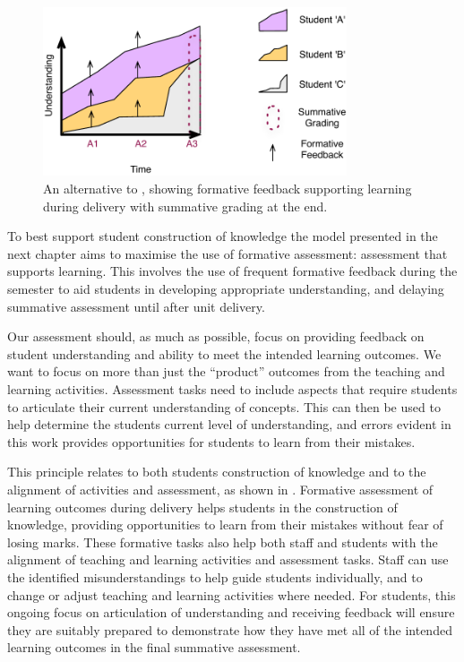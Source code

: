 \begin{figure}[h]
	\centering
	\includegraphics[width=0.8\textwidth]{FormativeFeedback}
	\caption{An alternative to , showing formative feedback supporting learning during delivery with summative grading at the end.}
	\label{fig:formative}
\end{figure}

To best support student construction of knowledge the model presented in the next chapter aims to maximise the use of formative assessment: assessment that supports learning. This involves the use of frequent formative feedback during the semester to aid students in developing appropriate understanding, and delaying summative assessment until after unit delivery.

Our assessment should, as much as possible, focus on providing feedback on student understanding and ability to meet the intended learning outcomes. We want to focus on more than just the ``product'' outcomes from the teaching and learning activities. Assessment tasks need to include aspects that require students to articulate their current understanding of concepts. This can then be used to help determine the students current level of understanding, and errors evident in this work provides opportunities for students to learn from their mistakes. 

This principle relates to both students construction of knowledge and to the alignment of activities and assessment, as shown in . Formative assessment of learning outcomes during delivery helps students in the construction of knowledge, providing opportunities to learn from their mistakes without fear of losing marks. These formative tasks also help both staff and students with the alignment of teaching and learning activities and assessment tasks. Staff can use the identified misunderstandings to help guide students individually, and to change or adjust teaching and learning activities where needed. For students, this ongoing focus on articulation of understanding and receiving feedback will ensure they are suitably prepared to demonstrate how they have met all of the intended learning outcomes in the final summative assessment.

